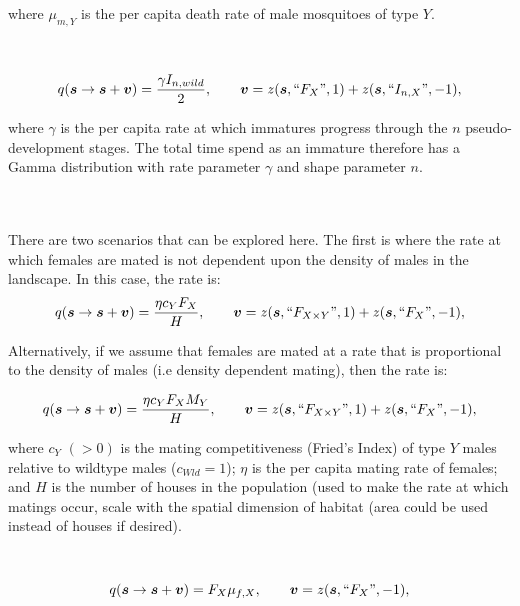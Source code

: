 \documentclass[]{article}  %
\begin{document}
\noindent where $\mu_{m, Y}$ is the per capita death rate of male mosquitoes of type $Y$.
\\
\\
\\
$$q(\boldsymbol{s} \rightarrow \boldsymbol{s} + \boldsymbol{v}) = \frac{ \gamma I_{n, wild}}{2}, \qquad \boldsymbol{v} = z(\boldsymbol{s}, \textup{``}F_X\textup{''} , 1) + z(\boldsymbol{s}, \textup{``} I_{n, X} \textup{''} , -1),$$

\noindent where $\gamma$ is the per capita rate at which immatures progress through the $n$ pseudo-development stages.  The total time spend as an immature therefore has a Gamma distribution with rate parameter $\gamma$ and shape parameter $n$.
\\
\\
\\

There are two scenarios that can be explored here.  The first is where the rate at which females are mated is not dependent upon the density of males in the landscape.  In this case, the rate is:
$$q(\boldsymbol{s} \rightarrow \boldsymbol{s} + \boldsymbol{v}) = \frac{\eta c_Y F_X}{H}, \qquad \boldsymbol{v} = z(\boldsymbol{s}, \textup{``}F_{X \times Y}\textup{''} , 1) + z(\boldsymbol{s}, \textup{``} F_X \textup{''} , -1),$$

Alternatively, if we assume that females are mated at a rate that is proportional to the density of males (i.e density dependent mating), then the rate is:

$$q(\boldsymbol{s} \rightarrow \boldsymbol{s} + \boldsymbol{v}) = \frac{\eta c_Y F_X M_Y}{H}, \qquad \boldsymbol{v} = z(\boldsymbol{s}, \textup{``}F_{X \times Y}\textup{''} , 1) + z(\boldsymbol{s}, \textup{``} F_X \textup{''} , -1),$$

\noindent where $c_Y$ $(> 0)$ is the mating competitiveness (Fried's Index) of type $Y$ males relative to wildtype males ($c_{Wld} = 1$); $\eta$ is the per capita mating rate of females; and $H$ is the number of houses in the population (used to make the rate at which matings occur, scale with the spatial dimension of habitat (area could be used instead of houses if desired).
\\
\\
\\
$$q(\boldsymbol{s} \rightarrow \boldsymbol{s} + \boldsymbol{v}) = F_{X} \mu_{f, X}, \qquad \boldsymbol{v} =  z(\boldsymbol{s}, \textup{``} F_{X} \textup{''} , -1),$$
\end{document}
